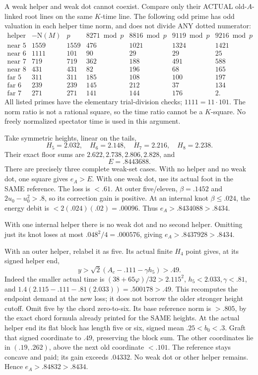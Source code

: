 A weak helper and weak dot cannot coexist.
Compare only their ACTUAL old-\(A\)-linked
root lines on the same \(K\)-time line.
The following odd prime has odd valuation
in each helper time norm, and does not
divide ANY dotted numerator:
\[
 \begin{array}{c|r|r|rrrr}
 \text{helper}&-\mathrm N(M)&p&
           8271\bmod p&8816\bmod p&9119\bmod p&9216\bmod p\\ \hline
 \text{near }5&1559&1559&476&1021&1324&1421\\
 \text{near }6&1111&101&90&29&29&25\\
 \text{near }7&719&719&362&188&491&588\\
 \text{near }8&431&431&82&196&68&165\\
 \text{far }5&311&311&185&108&100&197\\
 \text{far }6&239&239&145&212&37&134\\
 \text{far }7&271&271&141&144&176&2 .
 \end{array}
\]
All listed primes have the elementary
trial-division checks; \(1111=11\cdot101\).
The norm ratio is not a rational square,
so the time ratio cannot be a \(K\)-square.
No freely normalized spectator time is
used in this argument.

Take symmetric heights, linear on the tails,
\[
              H_5=2.032,\quad H_6=2.148,\quad
              H_7=2.216,\quad H_8=2.238 .
\]
Their exact floor sums are
\(2.622,2.738,2.806,2.828\), and
\[
                      E=.8443688 .
\]
There are precisely three complete weak-set cases.
With no helper and no weak dot,
one square gives \(e_A>E\).
With one weak dot, use its actual foot
in the SAME reference.
The loss is \(<.61\).
At outer five/eleven, \(\beta=.1452\)
and \(2u_0-u_0^2>.8\), so its correction
gain is positive.
At an internal knot \(\beta\le.024\),
the energy debit is \(<2(.024)(.02)=.00096\).
Thus \(e_A>.8434088>.8434\).

With one internal helper there is no weak
dot and no second helper.
Omitting just its knot loses at most
\(.048^2/4=.000576\), giving
\(e_A>.8437928>.8434\).

With an outer helper, relabel it as five.
Its actual finite \(H_4\) point gives,
at its signed helper end,
\[
            y>\sqrt2(A_c-.111-\gamma h_5)>.49 .
\]
Indeed the smaller actual time is
\((38+65\varphi)/32>2.115^2\),
\(h_5<2.033,\gamma<.81\), and
\(1.4(2.115-.111-.81(2.033))=.500178>.49\).
This recomputes the endpoint demand at
the new loss; it does not borrow the
older stronger height cutoff.
Omit five by the chord zero-to-six.
Its base reference norm is \(>.805\),
by the exact chord formula already printed
for the SAME heights.
At the actual helper end its flat block
has length five or six, signed mean
\(.25<b_0<.3\).
Graft that signed coordinate to \(.49\),
preserving the block sum.
The other coordinates lie in \((.19,.262)\),
above the next old coordinate \(<.101\).
The reference stays concave and paid;
its gain exceeds \(.04332\).
No weak dot or other helper remains.
Hence \(e_A>.84832>.8434\).

